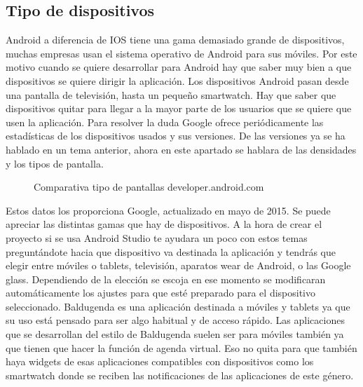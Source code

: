 \subsection{Tipo de dispositivos}
\label{subsecc:Tipo de dispositivos}

Android a diferencia de IOS tiene una gama demasiado grande de dispositivos, muchas empresas usan el sistema operativo de Android para sus móviles.
Por este motivo cuando se quiere desarrollar para Android hay que saber muy bien a que dispositivos se quiere dirigir la aplicación.
Los dispositivos Android pasan desde una pantalla de televisión, hasta un pequeño smartwatch.
Hay que saber que dispositivos quitar para llegar a la mayor parte de los usuarios que se quiere que usen la aplicación.
Para resolver la duda Google ofrece periódicamente las estadísticas de los dispositivos usados y sus versiones.
De las versiones ya se ha hablado en un tema anterior, ahora en este apartado se hablara de las densidades y los tipos de pantalla.

\begin{figure}[H] 
  \begin{center} 
    \caption{Comparativa tipo de pantallas developer.android.com} 
    \label{fig:ComparativaPantallas} 
  \end{center} 
\end{figure}

Estos datos los proporciona Google, actualizado en mayo de 2015.
Se puede apreciar las distintas gamas que hay de dispositivos. A la hora de crear el proyecto si se usa Android Studio te ayudara un poco con estos temas preguntándote hacia que dispositivo va destinada la aplicación y tendrás que elegir entre móviles o tablets, televisión, aparatos wear de Android, o las Google glass.
Dependiendo de la elección se escoja en ese momento se modificaran automáticamente los ajustes para que esté preparado para el dispositivo seleccionado.
Baldugenda es una aplicación destinada a móviles y tablets ya que su uso está pensado para ser algo habitual y de acceso rápido.
Las aplicaciones que se desarrollan del estilo de Baldugenda suelen ser para móviles también ya que tienen que hacer la función de agenda virtual. Eso no quita para que también haya widgets de esas aplicaciones compatibles con dispositivos como los smartwatch donde se reciben las notificaciones de las aplicaciones de este género.

